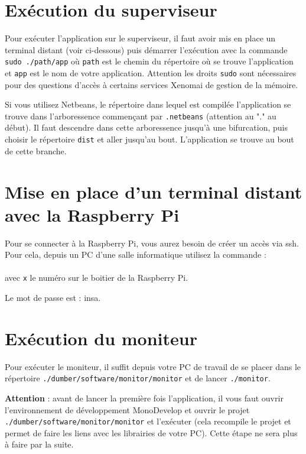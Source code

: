 \documentclass[11pt]{paper}
\newcommand{\raspi}{Raspberry Pi\xspace}
\begin{document}
\section{Exécution du superviseur}
\label{sec:utilisation}

Pour exécuter l'application sur le superviseur, il faut avoir mis en place un terminal distant (voir ci-dessous) puis démarrer l'exécution avec la commande {\tt sudo ./path/app} où {\tt path} est le chemin du répertoire où se trouve l'application et {\tt app} est le nom de votre application. Attention les droits {\tt sudo} sont nécessaires pour des questions d'accès à certains services Xenomai de gestion de la mémoire.

Si vous utilisez Netbeans, le répertoire dans lequel est compilée l'application se trouve dans l'arboressence commençant par {\tt .netbeans} (attention au "." au début). Il faut descendre dans cette arboressence jusqu'à une bifurcation, puis choisir le répertoire {\tt dist} et aller jusqu'au bout. L'application se trouve au bout de cette branche.


\section{Mise en place d'un terminal distant avec la \raspi}
\label{sec:ssh}

Pour se connecter à la \raspi, vous aurez besoin de créer un accès via ssh. Pour cela, depuis un PC d'une salle informatique utilisez la commande :\\ \indent{}\\
avec {\tt x} le numéro sur le boitier de la \raspi.

Le mot de passe est : insa.


\section{Exécution du moniteur}
\label{sec:utilisation}

Pour exécuter le moniteur, il suffit depuis votre PC de travail de se placer dans le répertoire {\tt ./dumber/software/monitor/monitor} et de lancer {\tt ./monitor}.

{\bf Attention} : avant de lancer la première fois l'application, il vous faut ouvrir l'environnement de développement MonoDevelop et ouvrir le projet {\tt ./dumber/software/monitor/monitor}  et l'exécuter (cela recompile le projet et permet de faire les liens avec les librairies de votre PC). Cette étape ne sera plus à faire par la suite.
\end{document}
